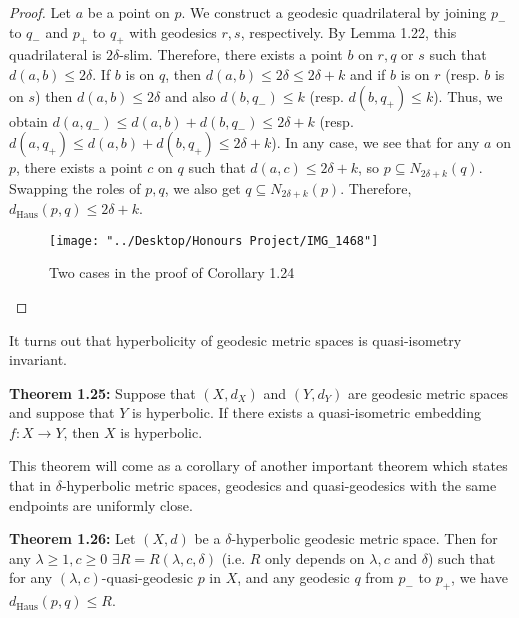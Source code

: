 \documentclass[12pt]{article}
\newcommand{\vs}{\vskip10pt}
\begin{document}
	\begin{proof}
		
		Let $a$ be a point on $p$. We construct a geodesic quadrilateral by joining $p_-$ to $q_-$ and $p_+$ to $q_+$ with geodesics $r,s$, respectively. By Lemma 1.22, this quadrilateral is $2 \delta$-slim. Therefore, there exists a point $b$ on $r,q$ or $s$ such that $d(a,b) \leq 2 \delta$. If $b$ is on $q$, then $d(a,b) \leq 2\delta \leq 2 \delta + k$ and if $b$ is on $r$ (resp. $b$ is on $s$) then $d(a,b) \leq 2\delta$ and also $d(b, q_-) \leq k$ (resp. $d(b, q_+) \leq k$). Thus, we obtain $d(a, q_-) \leq d(a,b) + d(b, q_-) \leq 2\delta + k$ (resp. $d(a, q_+) \leq d(a,b) + d(b, q_+) \leq 2\delta + k$). In any case, we see that for any $a$ on $p$, there exists a point $c$ on $q$ such that $d(a,c) \leq 2 \delta + k$, so $p \subseteq N_{2 \delta + k} (q)$. Swapping the roles of $p,q$, we also get $q \subseteq N_{2 \delta + k} (p)$. Therefore, $d_{\text{Haus}}(p,q) \leq 2 \delta + k$.
		
		\begin{figure} [H]
			\centering
			\texttt{[image: "../Desktop/Honours Project/IMG\_1468"]}
			\caption{Two cases in the proof of Corollary 1.24}
			\label{fig:img1468}
		\end{figure}
		
	\end{proof}
	
	It turns out that hyperbolicity of geodesic metric spaces is quasi-isometry invariant.
	
	\vs 
	
	\textbf{Theorem 1.25: } Suppose that $(X,d_X)$ and $(Y, d_Y)$ are geodesic metric spaces and suppose that $Y$ is hyperbolic. If there exists a quasi-isometric embedding $f : X \rightarrow Y$, then $X$ is hyperbolic. 
	
	\vs 
	
	This theorem will come as a corollary of another important theorem which states that in $\delta$-hyperbolic metric spaces, geodesics and quasi-geodesics with the same endpoints are uniformly close. 
	
	\vs 
	
	\textbf{Theorem 1.26: } Let $(X,d)$ be a $\delta$-hyperbolic geodesic metric space. Then for any $\lambda \geq 1, c \geq 0$ $\exists R = R(\lambda, c, \delta)$ (i.e. $R$ only depends on $\lambda, c$ and $\delta$) such that for any $(\lambda, c)$-quasi-geodesic $p$ in $X$, and any geodesic $q$ from $p_-$ to $p_+$, we have $d_{\text{Haus}}(p,q) \leq R$. 
	
\end{document}
